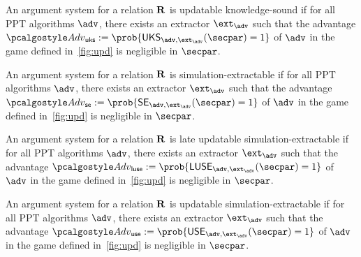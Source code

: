 
\begin{definition}\label{upd-KS}
	An argument system for a relation $\mathbf{R}$ is updatable knowledge-sound if for all PPT algorithms $\advse$, there exists an extractor $\ext_{\advse}$ such that the advantage $\Adv_{\uks} := \prob{\UKS_{\advse,\ext_{\advse}}(\secpar) = 1}$ of $\advse$ in the game defined in~\cref{fig:upd} is negligible in $\secpar$.
\end{definition}

\begin{definition}\label{se}
	An argument system for a relation $\mathbf{R}$ is simulation-extractable if for all PPT algorithms $\advse$, there exists an extractor $\ext_{\advse}$ such that the advantage $\Adv_{\se}:=\prob{ \SE_{\advse,\ext_{\advse}}(\secpar) = 1}$ of $\advse$ in the game defined in~\cref{fig:upd} is negligible in $\secpar$.
\end{definition}

\begin{definition}\label{late-use}
	An argument system for a relation $\mathbf{R}$ is late updatable simulation-extractable if for all PPT algorithms $\advse$, there exists an extractor $\ext_{\advse}$ such that the advantage $\Adv_{\luse}:=\prob{ \LUSE_{\advse,\ext_{\advse}}(\secpar) = 1}$ of $\advse$ in the game defined in~\cref{fig:upd} is negligible in $\secpar$.
\end{definition}

\begin{definition}\label{USE}
	An argument system for a relation $\mathbf{R}$ is updatable simulation-extractable if for all PPT algorithms $\advse$, there exists an extractor $\ext_{\advse}$ such that the advantage $\Adv_{\use} := \prob{ \USE_{\advse,\ext_{\advse}}(\secpar) = 1}$ of $\advse$ in the game defined in~\cref{fig:upd} is negligible in $\secpar$.
\end{definition}

